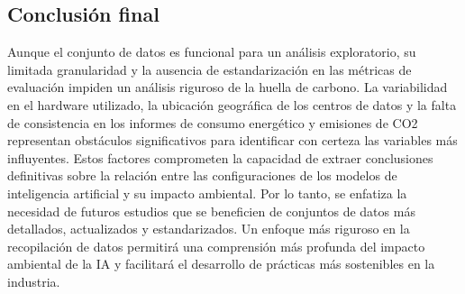 \documentclass[journal]{IEEEtran}
\begin{document}
	\subsection{Conclusión final}
	Aunque el conjunto de datos es funcional para un análisis exploratorio, su limitada granularidad y la ausencia de estandarización en las métricas de evaluación impiden un análisis riguroso de la huella de carbono. La variabilidad en el hardware utilizado, la ubicación geográfica de los centros de datos y la falta de consistencia en los informes de consumo energético y emisiones de CO2 representan obstáculos significativos para identificar con certeza las variables más influyentes.
	Estos factores comprometen la capacidad de extraer conclusiones definitivas sobre la relación entre las configuraciones de los modelos de inteligencia artificial y su impacto ambiental. Por lo tanto, se enfatiza la necesidad de futuros estudios que se beneficien de conjuntos de datos más detallados, actualizados y estandarizados. Un enfoque más riguroso en la recopilación de datos permitirá una comprensión más profunda del impacto ambiental de la IA y facilitará el desarrollo de prácticas más sostenibles en la industria.

	

	
\end{document}
